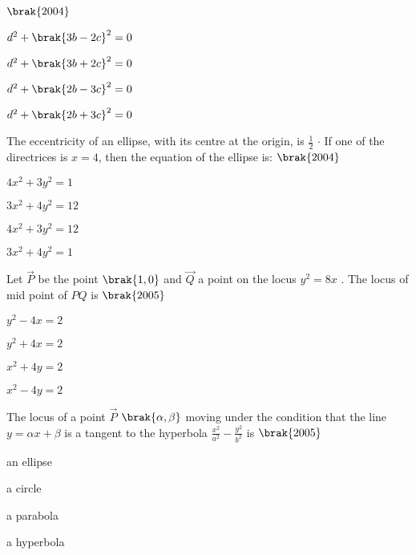 \hfill
\hfill{{$\brak {2004} $}}
\begin{enumerate}
\begin{multicols}{2}
\item {$ d^2 + \brak{3b-2c}^2 = 0 $}
\item {$ d^2 + \brak{3b+2c}^2 = 0 $}
\item {$ d^2 + \brak{2b-3c}^2 = 0 $}
\item {$ d^2 + \brak{2b+3c}^2 = 0 $}
\end{multicols}
\end{enumerate}
\hfill
\item The eccentricity of an ellipse, with its centre at the origin, is {$ \frac{1}{2} $} {$ \cdot $} If one of the directrices is {$ x = 4 $}, then the equation of the ellipse is: \hfill{{$ \brak{2004} $}}
\begin{enumerate}
\begin{multicols}{2}
\item {$ 4x^2+3y^2 = 1 $}
\item {$ 3x^2+4y^2 = 12 $}
\item {$ 4x^2+3y^2 = 12 $}
\item {$ 3x^2+4y^2 = 1 $}
\end{multicols}
\end{enumerate}
\hfill 
\item Let {$\vec{P}$} be the point {$ \brak{1,0} $} and {$\vec{Q}$} a point on the locus {$ y^2 = 8x $} . The locus of mid point of {$ PQ $} is \hfill{{$ \brak{2005} $}}
\begin{enumerate}
\begin{multicols}{2}
\item{$ y^2-4x=2 $}
\item{$ y^2+4x=2 $}
\item{$ x^2+4y=2 $}
\item{$ x^2-4y=2 $}
\end{multicols}
\end{enumerate}
\hfill
\item The locus of a point {$\vec{P}$} {$ \brak{\alpha,\beta} $} moving under the condition that the line {$ y = \alpha x + \beta $} is a tangent to the hyperbola {$ \frac{x^2}{a^2} - \frac{y^2}{b^2} $} is \hfill{{$ \brak{2005} $}}
\begin{enumerate}
\begin{multicols}{2}
\item an ellipse
\item a circle
\item a parabola
\item a hyperbola
\end{multicols}
\end{enumerate}
